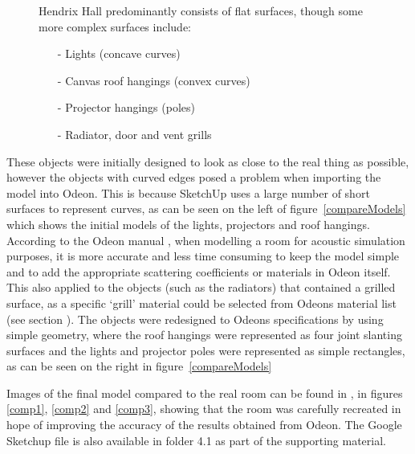 \documentclass[../../main.tex]{subfiles}
\begin{document}
			\begin{figure}[H]
			Hendrix Hall predominantly consists of flat surfaces, though some more complex surfaces include:
			\begin{itemize}
				\item[-] Lights (concave curves) 
				\item[-] Canvas roof hangings (convex curves) 
				\item[-] Projector hangings (poles)
				\item[-] Radiator, door and vent grills \\
			\end{itemize}
			\end{figure}

			These objects were initially designed to look as close to the real thing as possible, however the objects with curved edges posed a problem when importing the model into Odeon. This is because SketchUp uses a large number of short surfaces to represent curves, as can be seen on the left of figure~\ref{compareModels} which shows the initial models of the lights, projectors and roof hangings. According to the Odeon manual \cite{odeonManual}, when modelling a room for acoustic simulation purposes, it is more accurate and less time consuming to keep the model simple and to add the appropriate scattering coefficients or materials in Odeon itself. This also applied to the objects (such as the radiators) that contained a grilled surface, as a specific `grill' material could be selected from Odeons material list (see section ). The objects were redesigned to Odeons specifications by using simple geometry, where the roof hangings were represented as four joint slanting surfaces and the lights and projector poles were represented as simple rectangles, as can be seen on the right in figure~\ref{compareModels}

			Images of the final model compared to the real room can be found in , in figures \ref{comp1}, \ref{comp2} and \ref{comp3}, showing that the room was carefully recreated in hope of improving the accuracy of the results obtained from Odeon. The Google Sketchup file is also available in folder 4.1 as part of the supporting material.
\end{document}
